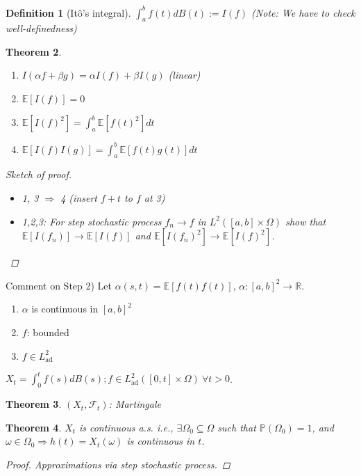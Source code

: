 \documentclass[12pt]{report}
\newcommand{\R}{\mathbb{R}}
\renewcommand{\P}{\mathbb{P}}
\newcommand{\F}{\mathcal{F}}
\newcommand{\E}{\mathbb{E}}
\renewcommand{\1}{\mathbb{1}}
\renewcommand{\O}{\Omega}
\renewcommand{\subset}{\subseteq}
\theoremstyle{break}
\newtheorem{thm}{Theorem}[section] %
\theoremstyle{newdef}
\newtheorem{defn}[thm]{Definition} %
\theoremstyle{remark}
\begin{document}
\begin{defn}[It\^o's integral]
$\int_a^b f(t) dB(t) := I(f)$
(Note: We have to check well-definedness)
\end{defn}

\begin{thm}
\leavevmode
\vspace{-6mm}
\begin{enumerate}
\item $I(\alpha f + \beta g) = \alpha I(f) + \beta I(g)$ (linear)
\item $\E[I(f)] = 0$
\item $\E[I(f)^2] = \int_a^b \E[f(t)^2]dt$
\item $\E[I(f)I(g)] = \int_a^b \E[f(t)g(t)]dt$
\end{enumerate}
\begin{proof}[Sketch of proof]
\leavevmode
\begin{itemize}
\item 1, 3 $\Rightarrow$ 4 (insert $f+t$ to $f$ at 3)
\item 1,2,3: For step stochastic process $f_n \rightarrow f$ in $L^2([a,b]\times\Omega)$ show that
$\E[I(f_n)] \rightarrow \E[I(f)]$ and $\E[I(f_n)^2] \rightarrow \E[I(f)^2]$.
\end{itemize}
\end{proof}
\end{thm}




Comment on Step 2)
Let $\alpha(s,t) = \E[f(t)f(t)]$, $\alpha: [a,b]^2 \rightarrow \R$.
\begin{enumerate}
\item $\alpha$ is continuous in $[a,b]^2$
\item $f$: bounded
\item $f \in L^2_{\text{ad}}$
\end{enumerate}


$X_t = \int_0^t f(s)dB(s); f \in L^2_{\text{ad}}([0,t] \times \O) \ \forall t > 0$.


\begin{thm}
$(X_t, \F_t)$: Martingale
\end{thm}

\begin{thm}
$X_t$ is continuous a.s.
i.e., $\exists \O_0 \subset \O$ such that $\P(\O_0) = 1$, and $\omega \in \O_0 \Rightarrow h(t) = X_t(\omega)$ is continuous in $t$.
\begin{proof}
Approximations via step stochastic process.
\end{proof}
\end{thm}
\end{document}
